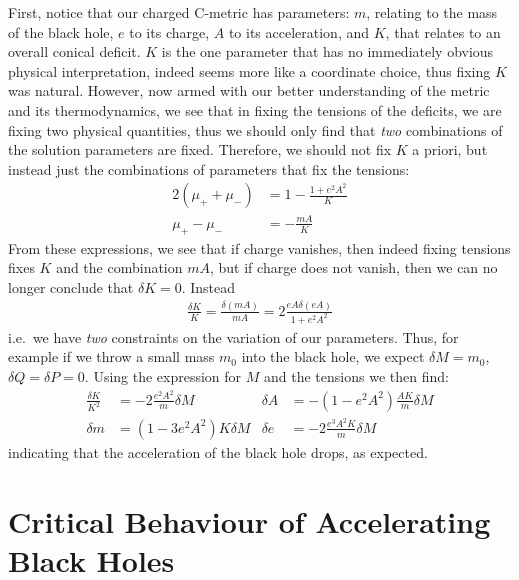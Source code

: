 \documentclass[
twoside,
openright,
frontopenright
]{dmathesis}
\newcommand{\nn}{\nonumber}
\begin{document}
First, notice that our charged C-metric has parameters: $m$, relating to the
mass of the black hole, $e$ to its charge, $A$ to its acceleration, and $K$,
that relates to an overall conical deficit. $K$ is the one parameter that has no
immediately obvious physical interpretation, indeed seems more like a coordinate
choice, thus fixing $K$ was natural. However, now armed with our better
understanding of the metric and its thermodynamics, we see that in fixing the
tensions of the deficits, we are fixing two physical quantities, thus we should
only find that {\it two} combinations of the solution parameters are
fixed. Therefore, we should not fix $K$ a priori, but instead just the
combinations of parameters that fix the tensions:
\begin{align}
2(\mu_++\mu_-) &= 1 - \frac{1+e^2A^2}{K} \nn\\
\mu_+ - \mu_- &= - \frac{mA}{K}
\end{align}
From these expressions, we see that if charge vanishes, then indeed fixing
tensions fixes $K$ and the combination $mA$, but if charge does not vanish, then
we can no longer conclude that $\delta K=0$. Instead
\begin{align}
  \frac{\delta K}{K} = \frac{\delta (mA)}{mA} = 2\frac{eA\delta (eA)}{1+e^2A^2}
\end{align}
i.e.\ we have {\it two} constraints on the variation of our parameters.  Thus,
for example if we throw a small mass $m_0$ into the black hole, we expect
$\delta M = m_0$, $\delta Q=\delta P = 0$. Using the expression for $M$ and the
tensions we then find:
\begin{align}
\frac{\delta K}{K^2} &= - 2 \frac{e^2 A^2}{m}\delta M &
\delta A &= - (1-e^2 A^2) \frac{AK}{m} \delta M\nn\\
\delta m &= (1- 3 e^2 A^2) K \delta M&
\delta e &= -2\frac{e^3A^2K}{m} \delta M
\end{align}
indicating that the acceleration of the black hole drops, as expected.

\section{Critical Behaviour of Accelerating Black Holes}
\end{document}
